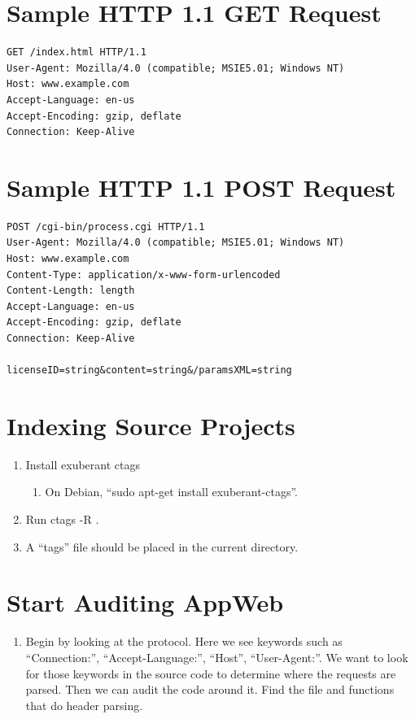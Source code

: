 \documentclass[12pt]{Training}
\begin{document}
\section*{Sample HTTP 1.1 GET Request}
\begin{sectionbox}
\begin{lstlisting}
GET /index.html HTTP/1.1
User-Agent: Mozilla/4.0 (compatible; MSIE5.01; Windows NT)
Host: www.example.com
Accept-Language: en-us
Accept-Encoding: gzip, deflate
Connection: Keep-Alive
\end{lstlisting}
\end{sectionbox}

\section*{Sample HTTP 1.1 POST Request}
\begin{sectionbox}
\begin{lstlisting}
POST /cgi-bin/process.cgi HTTP/1.1
User-Agent: Mozilla/4.0 (compatible; MSIE5.01; Windows NT)
Host: www.example.com
Content-Type: application/x-www-form-urlencoded
Content-Length: length
Accept-Language: en-us
Accept-Encoding: gzip, deflate
Connection: Keep-Alive

licenseID=string&content=string&/paramsXML=string
\end{lstlisting}
\end{sectionbox}

\section*{Indexing Source Projects}
\begin{enumerate}
    \item Install exuberant ctags
        \begin{enumerate}
            \item On Debian, ``sudo apt-get install exuberant-ctags''.
        \end{enumerate}
    \item Run ctags -R .
    \item A ``tags'' file should be placed in the current directory.
\end{enumerate}

\section*{Start Auditing AppWeb}
\begin{enumerate}
    \item Begin by looking at the protocol. Here we see keywords such as ``Connection:'', ``Accept-Language:'', ``Host'', ``User-Agent:''. We want to look for those keywords in the source code to determine where the requests are parsed. Then we can audit the code around it. Find the file and functions that do header parsing.
\end{enumerate}
\end{document}
